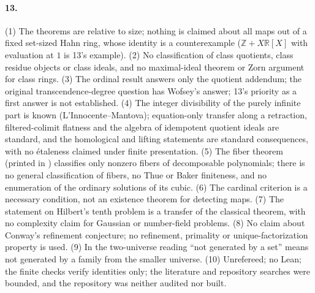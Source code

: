 \documentclass[11pt,letterpaper]{article}
\numberwithin{equation}{section}
\theoremstyle{definition}
\theoremstyle{remark}
\theoremstyle{plain}
\newcommand{\Z}{\mathbb Z}
\newcommand{\R}{\mathbb R}
\begin{document}
\paragraph{13.} (1) The theorems are relative to size; nothing is claimed about all maps out of a fixed set-sized Hahn
ring, whose identity is a counterexample ($\Z+X\R[X]$ with evaluation at $1$ is 13's example). (2) No classification of
class quotients, class residue objects or class ideals, and no maximal-ideal theorem or Zorn argument for class rings.
(3) The ordinal result answers only the quotient addendum; the original transcendence-degree question has Wofsey's
answer; 13's priority as a first answer is not established. (4) The integer divisibility of the purely infinite part is
known (L'Innocente--Mantova); equation-only transfer along a retraction, filtered-colimit flatness and the algebra of
idempotent quotient ideals are standard, and the homological and lifting statements are standard consequences, with no
\'etaleness claimed under finite presentation. (5) The fiber theorem (printed in \cite{RepoOdg}) classifies only nonzero
fibers of decomposable polynomials; there is no general classification of fibers, no Thue or Baker finiteness, and no
enumeration of the ordinary solutions of its cubic. (6) The cardinal criterion is a necessary condition, not an existence
theorem for detecting maps. (7) The statement on Hilbert's tenth problem is a transfer of the classical theorem, with no
complexity claim for Gaussian or number-field problems. (8) No claim about Conway's refinement conjecture; no refinement,
primality or unique-factorization property is used. (9) In the two-universe reading ``not generated by a set'' means not
generated by a family from the smaller universe. (10) Unrefereed; no Lean; the finite checks verify identities only; the
literature and repository searches were bounded, and the repository was neither audited nor built.
\end{document}
